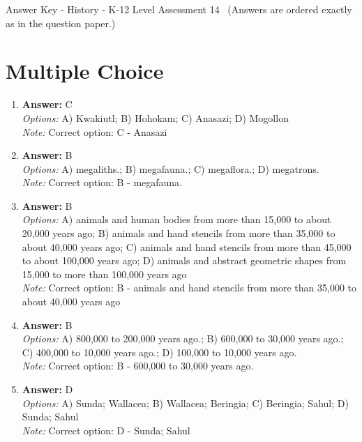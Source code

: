\documentclass[12pt]{article}
\begin{document}
\begin{center}
Answer Key - History - K-12 Level Assessment 14 \
\small (Answers are ordered exactly as in the question paper.)
\end{center}

\section*{Multiple Choice}
\begin{enumerate}[label=\arabic*.]
\item \textbf{Answer:} C
\\ \textit{Options:} A) Kwakiutl; B) Hohokam; C) Anasazi; D) Mogollon
\\ \textit{Note:} Correct option: C - Anasazi
\item \textbf{Answer:} B
\\ \textit{Options:} A) megaliths.; B) megafauna.; C) megaflora.; D) megatrons.
\\ \textit{Note:} Correct option: B - megafauna.
\item \textbf{Answer:} B
\\ \textit{Options:} A) animals and human bodies from more than 15,000 to about 20,000 years ago; B) animals and hand stencils from more than 35,000 to about 40,000 years ago; C) animals and hand stencils from more than 45,000 to about 100,000 years ago; D) animals and abstract geometric shapes from 15,000 to more than 100,000 years ago
\\ \textit{Note:} Correct option: B - animals and hand stencils from more than 35,000 to about 40,000 years ago
\item \textbf{Answer:} B
\\ \textit{Options:} A) 800,000 to 200,000 years ago.; B) 600,000 to 30,000 years ago.; C) 400,000 to 10,000 years ago.; D) 100,000 to 10,000 years ago.
\\ \textit{Note:} Correct option: B - 600,000 to 30,000 years ago.
\item \textbf{Answer:} D
\\ \textit{Options:} A) Sunda; Wallacea; B) Wallacea; Beringia; C) Beringia; Sahul; D) Sunda; Sahul
\\ \textit{Note:} Correct option: D - Sunda; Sahul
\end{enumerate}
\end{document}
